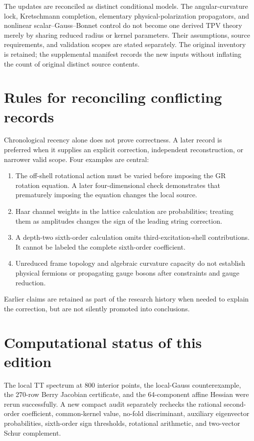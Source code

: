 \documentclass[11pt,oneside]{report}
\begin{document}
The updates are reconciled as distinct conditional models. The angular-curvature lock, Kretschmann completion, elementary physical-polarization propagators, and nonlinear scalar--Gauss--Bonnet control do not become one derived TPV theory merely by sharing reduced radius or kernel parameters. Their assumptions, source requirements, and validation scopes are stated separately. The original inventory is retained; the supplemental manifest records the new inputs without inflating the count of original distinct source contents.

\section{Rules for reconciling conflicting records}
Chronological recency alone does not prove correctness. A later record is preferred when it supplies an explicit correction, independent reconstruction, or narrower valid scope. Four examples are central:
\begin{enumerate}
\item The off-shell rotational action must be varied before imposing the GR rotation equation. A later four-dimensional check demonstrates that prematurely imposing the equation changes the local source.
\item Haar channel weights in the lattice calculation are probabilities; treating them as amplitudes changes the sign of the leading string correction.
\item A depth-two sixth-order calculation omits third-excitation-shell contributions. It cannot be labeled the complete sixth-order coefficient.
\item Unreduced frame topology and algebraic curvature capacity do not establish physical fermions or propagating gauge bosons after constraints and gauge reduction.
\end{enumerate}
Earlier claims are retained as part of the research history when needed to explain the correction, but are not silently promoted into conclusions.

\section{Computational status of this edition}
The local TT spectrum at 800 interior points, the local-Gauss counterexample, the 270-row Berry Jacobian certificate, and the 64-component affine Hessian were rerun successfully. A new compact audit separately rechecks the rational second-order coefficient, common-kernel value, no-fold discriminant, auxiliary eigenvector probabilities, sixth-order sign thresholds, rotational arithmetic, and two-vector Schur complement.
\end{document}
